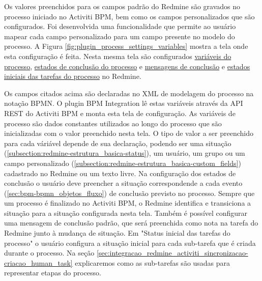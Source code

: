 Os valores preenchidos para os campos padrão do Redmine são gravados no processo iniciado no Activiti BPM, bem como os campos personalizados que são configurados. Foi desenvolvida uma funcionalidade que permite ao usuário mapear cada campo personalizado para um campo presente no modelo do processo. A Figura \ref{fig:plugin_process_settings_variables} mostra a tela onde esta configuração é feita. Nesta mesma tela são configurados \underline{variáveis do processo},  \underline{estados de conclusão do processo} e \underline{mensagens de conclusão} e \underline{estados iniciais das tarefas do processo} no Redmine. 

Os campos citados acima são declaradas no XML de modelagem do processo na notação BPMN. O plugin BPM Integration lê estas variáveis através da API REST do Activiti BPM e monta esta tela de configuração.
As variáveis de processo são dados constantes utilizados ao longo do processo que são inicializadas com o valor preenchido nesta tela. O tipo de valor a ser preenchido para cada váriável depende de sua declaração, podendo ser uma situação (\ref{subsection:redmine-estrutura_basica-status}), um usuário, um grupo ou um campo personalizado (\ref{subsection:redmine-estrutura_basica-custom_fields}) cadastrado no Redmine ou um texto livre. Na configuração dos estados de conclusão o usuário deve preencher a situação correspondende a cada evento (\ref{sec:bpm-bpmn_objetos_fluxo}) de conclusão previsto no processo. Sempre que um processo é finalizado no Activiti BPM, o Redmine identifica e transiciona a situação para a situação configurada nesta tela. Também é possível configurar uma mensagem de conclusão padrão, que será preenchida como nota na tarefa do Redmine junto à mudança de situação. Em "Status inicial das tarefas do processo" o usuário configura a situação inicial para cada sub-tarefa que é criada durante o processo. Na seção \ref{sec:integracao_redmine_activiti_sincronizacao-criacao_human_task} explicaremos como as sub-tarefas são usadas para representar etapas do processo.

